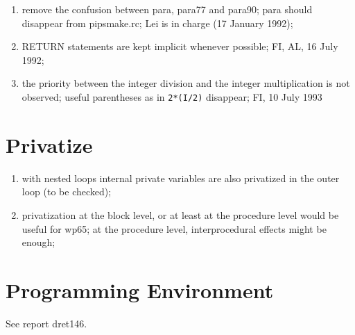 \begin{enumerate}
  \item remove the confusion between para, para77 and para90; para should
	disappear from pipsmake.rc; Lei is in charge (17 January 1992);

  \item RETURN statements are kept implicit whenever possible;
	FI, AL, 16 July 1992;

  \item the priority between the integer division and the integer
	multiplication is not observed; useful parentheses as in
	\verb+2*(I/2)+ disappear; FI, 10 July 1993

\end{enumerate}

\section{Privatize}

\begin{enumerate}

  \item with nested loops internal private variables are also privatized
	in the outer loop (to be checked);

  \item privatization at the block level, or at least at the procedure
	level would be useful for wp65; at the procedure level, interprocedural
	effects might be enough;

\end{enumerate}

\section{Programming Environment}

See report dret146.

